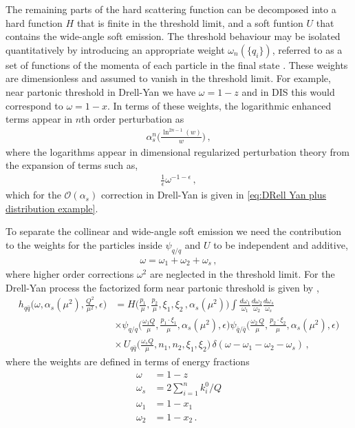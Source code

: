 \medskip
The remaining parts of the hard scattering function can be decomposed into a hard function $H$ that is finite in the threshold limit, and a soft funtion $U$ that contains the wide-angle soft emission. The threshold behaviour may be isolated quantitatively by introducing an appropriate weight $\omega_{n}(\{q_i\})$, referred to as a set of functions of the momenta of each particle in the final state \cite{Contopanagos:1996nh}. These weights are dimensionless and assumed to vanish in the threshold limit. For example, near partonic threshold in Drell-Yan we have $\omega=1-z$ and in DIS this would correspond to $\omega=1-x$. In terms of these weights, the logarithmic enhanced terms appear in $n$th order perturbation as
\begin{align}\label{eq:enhanced weights}
    \alpha_{s}^{n}\Big(\frac{\ln^{2n-1}(w)}{w}\Big)\,,
\end{align}
where the logarithms appear in dimensional regularized perturbation theory from the expansion of terms such as,
\begin{align}
    \frac{1}{\epsilon}\omega^{-1-\epsilon}\,,
\end{align}
which for the $\mathcal{O}(\alpha_s)$ correction in Drell-Yan is given in \cref{eq:DRell Yan plus distribution example}.

To separate the collinear and wide-angle soft emission we need the contribution to the weights for the particles inside $\psi_{q/q}$ and $U$ to be independent and additive,
\begin{align}
    \omega=\omega_1+\omega_2+\omega_s\,,
\end{align}
where higher order corrections $\omega^{2}$ are neglected in the threshold limit. For the Drell-Yan process the factorized form near partonic threshold is given by \cite{Contopanagos:1996nh},
\begin{align}\label{eq:Near threshold hard scattering}
    h_{q\bar{q}}\Big(\omega,\alpha_{s}(\mu^{2}),\frac{Q^{2}}{\mu^{2}},\epsilon\Big)&=H\Big(\frac{p_1}{\mu},\frac{p_2}{\mu},\xi_1,\xi_2\,,\alpha_{s}(\mu^{2})\Big)\int\frac{d\omega_1}{\omega_1}\frac{d\omega_2}{\omega_2}\frac{d\omega_s}{\omega_s}\nonumber
    \\
    &\times\psi_{q/q}\Big(\frac{\omega_1Q}{\mu},\frac{p_1\cdot\xi_1}{\mu},\alpha_{s}(\mu^{2}),\epsilon\Big)\psi_{\bar{q}/\bar{q}}\Big(\frac{\omega_2\,Q}{\mu},\frac{p_2\cdot\xi_2}{\mu},\alpha_{s}(\mu^{2}),\epsilon\Big)\nonumber
    \\
    &\times\,U_{q\bar{q}}\Big(\frac{\omega_{s}Q}{\mu},n_1,n_2,\xi_1,\xi_2\Big)\,\delta(\omega-\omega_1-\omega_2-\omega_s)\,,
\end{align}
where the weights are defined in terms of energy fractions
\begin{align}
    \omega&=1-z
    \\
    \omega_s&=2\sum_{i=1}^{n}k_{i}^{0}/Q
    \\
    \omega_1&=1-x_1
    \\
    \omega_2&=1-x_2\,.
\end{align}

